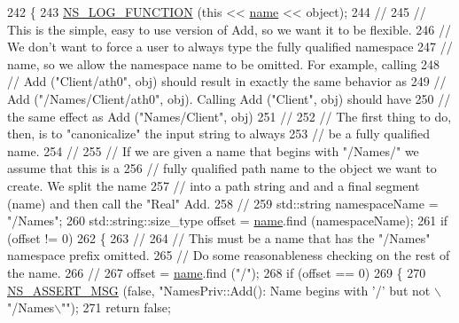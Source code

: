 \begin{DoxyCode}
242 \{
243   \hyperlink{log-macros-disabled_8h_a90b90d5bad1f39cb1b64923ea94c0761}{NS\_LOG\_FUNCTION} (\textcolor{keyword}{this} << \hyperlink{generate__test__data__lte__spectrum__model_8m_ab74e6bf80237ddc4109968cedc58c151}{name} << \textcolor{keywordtype}{object});
244   \textcolor{comment}{//}
245   \textcolor{comment}{// This is the simple, easy to use version of Add, so we want it to be flexible.}
246   \textcolor{comment}{// We don't want to force a user to always type the fully qualified namespace }
247   \textcolor{comment}{// name, so we allow the namespace name to be omitted.  For example, calling}
248   \textcolor{comment}{// Add ("Client/ath0", obj) should result in exactly the same behavior as}
249   \textcolor{comment}{// Add ("/Names/Client/ath0", obj).  Calling Add ("Client", obj) should have}
250   \textcolor{comment}{// the same effect as Add ("Names/Client", obj)}
251   \textcolor{comment}{//}
252   \textcolor{comment}{// The first thing to do, then, is to "canonicalize" the input string to always}
253   \textcolor{comment}{// be a fully qualified name.}
254   \textcolor{comment}{//}
255   \textcolor{comment}{// If we are given a name that begins with "/Names/" we assume that this is a}
256   \textcolor{comment}{// fully qualified path name to the object we want to create.  We split the name}
257   \textcolor{comment}{// into a path string and and a final segment (name) and then call the "Real" Add.}
258   \textcolor{comment}{//}
259   std::string namespaceName = \textcolor{stringliteral}{"/Names"};
260   std::string::size\_type offset = \hyperlink{generate__test__data__lte__spectrum__model_8m_ab74e6bf80237ddc4109968cedc58c151}{name}.find (namespaceName);
261   \textcolor{keywordflow}{if} (offset != 0)
262     \{
263       \textcolor{comment}{//}
264       \textcolor{comment}{// This must be a name that has the "/Names" namespace prefix omitted.}
265       \textcolor{comment}{// Do some reasonableness checking on the rest of the name.}
266       \textcolor{comment}{//}
267       offset = \hyperlink{generate__test__data__lte__spectrum__model_8m_ab74e6bf80237ddc4109968cedc58c151}{name}.find (\textcolor{stringliteral}{"/"});
268       \textcolor{keywordflow}{if} (offset == 0)
269         \{
270           \hyperlink{assert_8h_aff5ece9066c74e681e74999856f08539}{NS\_ASSERT\_MSG} (\textcolor{keyword}{false}, \textcolor{stringliteral}{"NamesPriv::Add(): Name begins with '/' but not \(\backslash\)"/Names\(\backslash\)""});
271           \textcolor{keywordflow}{return} \textcolor{keyword}{false};

\end{DoxyCode}
